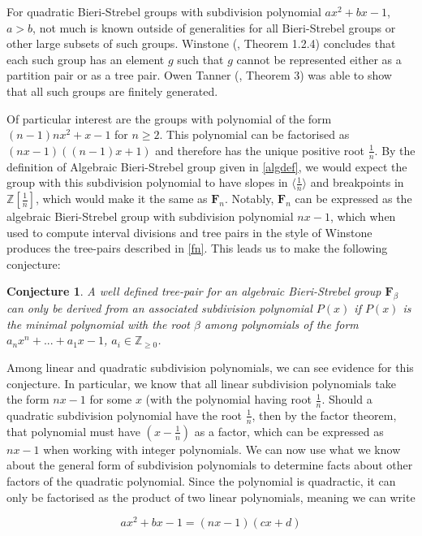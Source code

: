 \documentclass[
11pt, %
english, %
singlespacing, %
parskip, %
headsepline, %
]{amsart} %
\newtheorem{conjecture}[theorem]{Conjecture}
\theoremstyle{definition}
\newcommand{\FN}[1]{$\textbf{F}_{#1}$}
\begin{document}
For quadratic Bieri-Strebel groups with subdivision polynomial $ax^2+bx-1$, $a>b$, not much is known outside of generalities for all Bieri-Strebel groups or other large subsets of such groups. Winstone (\cite{Winstone}, Theorem 1.2.4) concludes that each such group has an element $g$ such that $g$ cannot be represented either as a partition pair or as a tree pair. Owen Tanner (\cite{Tanner}, Theorem 3) was able to show that all such groups are finitely generated.
\par
Of particular interest are the groups with polynomial of the form $(n-1)nx^2+x-1$ for $n \geq 2$. This polynomial can be factorised as $(nx-1)((n-1)x+1)$ and therefore has the unique positive root $\frac{1}{n}$. By the definition of Algebraic Bieri-Strebel group given in \ref{algdef}, we would expect the group with this subdivision polynomial to have slopes in $\langle \frac{1}{n} \rangle$ and breakpoints in $\mathbb{Z}[\frac{1}{n}]$, which would make it the same as \FN{n}. Notably, \FN{n} can be expressed as the algebraic Bieri-Strebel group with subdivision polynomial $nx-1$, which when used to compute interval divisions and tree pairs in the style of Winstone produces the tree-pairs described in \ref{fn}. This leads us to make the following conjecture:

\begin{conjecture}
A well defined tree-pair for an algebraic Bieri-Strebel group \FN{\beta} can only be derived from an associated subdivision polynomial $P(x)$ if $P(x)$ is the minimal polynomial with the root $\beta$ among polynomials of the form $a_nx^n + ... + a_1x -1$, $a_i \in \mathbb{Z}_{\geq 0}$.
\end{conjecture}

Among linear and quadratic subdivision polynomials, we can see evidence for this conjecture. In particular, we know that all linear subdivision polynomials take the form $nx-1$ for some $x$ (with the polynomial having root $\frac{1}{n}$. Should a quadratic subdivision polynomial have the root $\frac{1}{n}$, then by the factor theorem, that polynomial must have $(x-\frac{1}{n})$ as a factor, which can be expressed as $nx-1$ when working with integer polynomials. We can now use what we know about the general form of subdivision polynomials to determine facts about other factors of the quadratic polynomial. Since the polynomial is quadractic, it can only be factorised as the product of two linear polynomials, meaning we can write

\begin{equation}
ax^2+bx-1 = (nx-1)(cx+d)
\end{equation}
\end{document}
